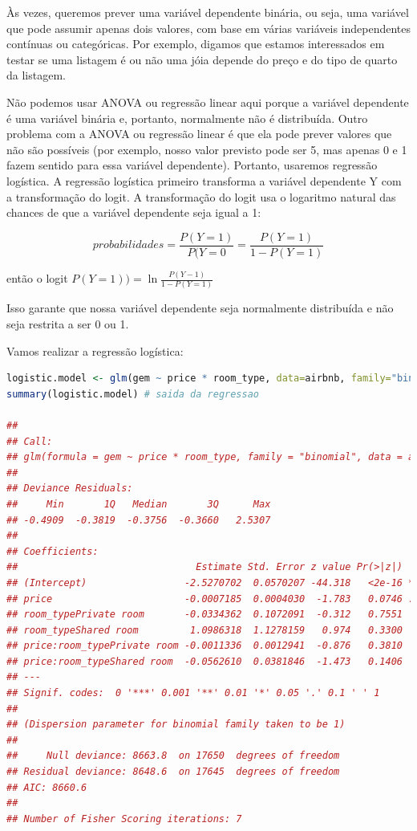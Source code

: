 \documentclass{article}
\begin{document}
Às vezes, queremos prever uma variável dependente binária, ou seja, uma variável que pode assumir apenas dois valores, com base em várias variáveis independentes contínuas ou categóricas. Por exemplo, digamos que estamos interessados em testar se uma listagem é ou não uma jóia depende do preço e do tipo de quarto da listagem.

Não podemos usar ANOVA ou regressão linear aqui porque a variável dependente é uma variável binária e, portanto, normalmente não é distribuída. Outro problema com a ANOVA ou regressão linear é que ela pode prever valores que não são possíveis (por exemplo, nosso valor previsto pode ser 5, mas apenas 0 e 1 fazem sentido para essa variável dependente). Portanto, usaremos regressão logística. A regressão logística primeiro transforma a variável dependente Y com a transformação do logit. A transformação do logit usa o logaritmo natural das chances de que a variável dependente seja igual a 1:
\vspace{.25cm}

$$
probabilidades=\displaystyle\frac{P(Y=1)}{P(Y=0}=\displaystyle\frac{P(Y=1)}{1-P(Y=1)}
$$

\vspace{.25cm}
\hspace{5cm}então o logit $P(Y=1))=\ln\displaystyle\frac{P(Y-1)}{1-P(Y=1)}$
\vspace{.25cm}

Isso garante que nossa variável dependente seja normalmente distribuída e não seja restrita a ser 0 ou 1.

Vamos realizar a regressão logística:

\begin{lstlisting}[language=R]
logistic.model <- glm(gem ~ price * room_type, data=airbnb, family="binomial") # o argumento family = "binomial" diz R para tratar a variavel dependente como uma variavel 0/1
summary(logistic.model) # saida da regressao

## 
## Call:
## glm(formula = gem ~ price * room_type, family = "binomial", data = airbnb)
## 
## Deviance Residuals: 
##     Min       1Q   Median       3Q      Max  
## -0.4909  -0.3819  -0.3756  -0.3660   2.5307  
## 
## Coefficients:
##                               Estimate Std. Error z value Pr(>|z|)    
## (Intercept)                 -2.5270702  0.0570207 -44.318   <2e-16 ***
## price                       -0.0007185  0.0004030  -1.783   0.0746 .  
## room_typePrivate room       -0.0334362  0.1072091  -0.312   0.7551    
## room_typeShared room         1.0986318  1.1278159   0.974   0.3300    
## price:room_typePrivate room -0.0011336  0.0012941  -0.876   0.3810    
## price:room_typeShared room  -0.0562610  0.0381846  -1.473   0.1406    
## ---
## Signif. codes:  0 '***' 0.001 '**' 0.01 '*' 0.05 '.' 0.1 ' ' 1
## 
## (Dispersion parameter for binomial family taken to be 1)
## 
##     Null deviance: 8663.8  on 17650  degrees of freedom
## Residual deviance: 8648.6  on 17645  degrees of freedom
## AIC: 8660.6
## 
## Number of Fisher Scoring iterations: 7

\end{lstlisting}
\end{document}
